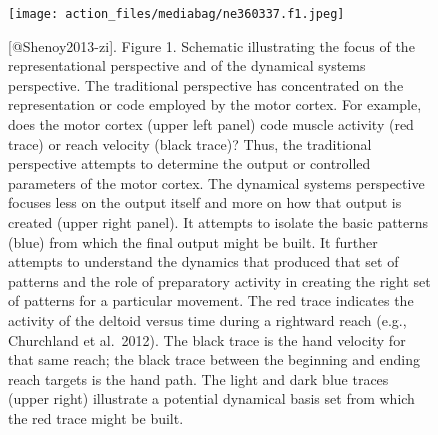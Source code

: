 \documentclass[
  letterpaper,
  DIV=11,
  numbers=noendperiod]{scrartcl}
\begin{document}
\begin{figure}[H]

{\centering \texttt{[image: action\_files/mediabag/ne360337.f1.jpeg]}

}

\caption{{[}@Shenoy2013-zi{]}. Figure 1. Schematic illustrating the
focus of the representational perspective and of the dynamical systems
perspective. The traditional perspective has concentrated on the
representation or code employed by the motor cortex. For example, does
the motor cortex (upper left panel) code muscle activity (red trace) or
reach velocity (black trace)? Thus, the traditional perspective attempts
to determine the output or controlled parameters of the motor cortex.
The dynamical systems perspective focuses less on the output itself and
more on how that output is created (upper right panel). It attempts to
isolate the basic patterns (blue) from which the final output might be
built. It further attempts to understand the dynamics that produced that
set of patterns and the role of preparatory activity in creating the
right set of patterns for a particular movement. The red trace indicates
the activity of the deltoid versus time during a rightward reach (e.g.,
Churchland et al.~2012). The black trace is the hand velocity for that
same reach; the black trace between the beginning and ending reach
targets is the hand path. The light and dark blue traces (upper right)
illustrate a potential dynamical basis set from which the red trace
might be built.}

\end{figure}%
\end{document}
